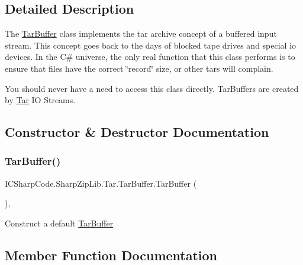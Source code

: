 \subsection{Detailed Description}
The \hyperlink{class_i_c_sharp_code_1_1_sharp_zip_lib_1_1_tar_1_1_tar_buffer}{Tar\+Buffer} class implements the tar archive concept of a buffered input stream. This concept goes back to the days of blocked tape drives and special io devices. In the C\# universe, the only real function that this class performs is to ensure that files have the correct \char`\"{}record\char`\"{} size, or other tars will complain. 

You should never have a need to access this class directly. Tar\+Buffers are created by \hyperlink{namespace_i_c_sharp_code_1_1_sharp_zip_lib_1_1_tar}{Tar} IO Streams. 

\subsection{Constructor \& Destructor Documentation}
\mbox{\label{class_i_c_sharp_code_1_1_sharp_zip_lib_1_1_tar_1_1_tar_buffer_aee98b79315ca4d827da490a287bc93d2}} 
\subsubsection{\texorpdfstring{Tar\+Buffer()}{TarBuffer()}}
{\footnotesize\ttfamily I\+C\+Sharp\+Code.\+Sharp\+Zip\+Lib.\+Tar.\+Tar\+Buffer.\+Tar\+Buffer (\begin{DoxyParamCaption}{ }\end{DoxyParamCaption})\hspace{0.3cm}{\ttfamily [inline]}, {\ttfamily [protected]}}



Construct a default \hyperlink{class_i_c_sharp_code_1_1_sharp_zip_lib_1_1_tar_1_1_tar_buffer}{Tar\+Buffer} 



\subsection{Member Function Documentation}
\mbox{\label{class_i_c_sharp_code_1_1_sharp_zip_lib_1_1_tar_1_1_tar_buffer_a3afc582eabfc493257c71e2fd317b3cc}} 
